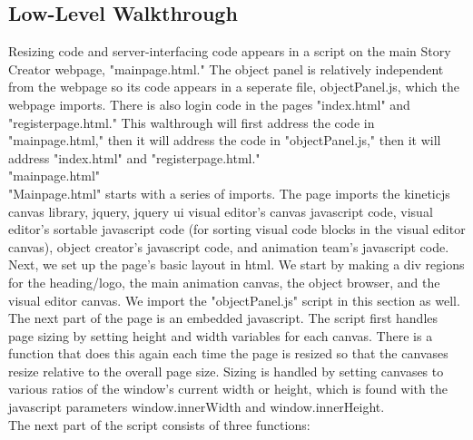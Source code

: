 \documentclass[12pt]{article}
\begin{document}
\subsection{Low-Level Walkthrough}

Resizing code and server-interfacing code appears in a script on the main Story Creator webpage, "mainpage.html." The object panel is relatively independent from the webpage so its code appears in a seperate file, objectPanel.js, which the webpage imports. There is also login code in the pages "index.html" and "registerpage.html." This walthrough will first address the code in "mainpage.html," then it will address the code in "objectPanel.js," then it will address "index.html" and "registerpage.html." \\

"mainpage.html" \\

"Mainpage.html" starts with a series of imports. The page imports the kineticjs canvas library, jquery, jquery ui visual editor's canvas javascript code, visual editor's sortable javascript code (for sorting visual code blocks in the visual editor canvas), object creator's javascript code, and animation team's javascript code. \\

Next, we set up the page's basic layout in html. We start by making a div regions for the heading/logo, the main animation canvas, the object browser, and the visual editor canvas. We import the "objectPanel.js" script in this section as well. \\

The next part of the page is an embedded javascript. The script first handles page sizing by setting height and width variables for each canvas. There is a function that does this again each time the page is resized so that the canvases resize relative to the overall page size. Sizing is handled by setting canvases to various ratios of the window's current width or height, which is found with the javascript parameters window.innerWidth and window.innerHeight. \\

The next part of the script consists of three functions: \\
\end{document}
